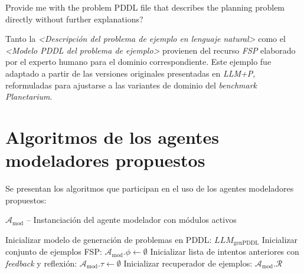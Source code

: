 \begin{anexes}
\begin{tcolorbox}[colback=gray!10!white, colframe=black, title=\textit{Prompt} del agente modelador con \textit{FSP}, fonttitle=\bfseries, breakable]
Provide me with the problem PDDL file that describes the planning problem directly without further explanations?
\end{tcolorbox}

Tanto la \textit{<Descripción del problema de ejemplo en lenguaje natural>} como el \textit{<Modelo PDDL del problema de ejemplo>} provienen del recurso \textit{FSP} elaborado por el experto humano para el dominio correspondiente. Este ejemplo fue adaptado a partir de las versiones originales presentadas en \textit{LLM+P}, reformuladas para ajustarse a las variantes de dominio del \textit{benchmark Planetarium}.


\section*{Algoritmos de los agentes modeladores propuestos}

Se presentan los algoritmos que participan en el uso de los agentes modeladores propuestos:

\begin{algorithm}[H]
\caption{\(\mathcal{A}_{\text{mod}}\) -- Instanciación del agente modelador con módulos activos}
\label{alg:instanciacion-agente}


Inicializar modelo de generación de problemas en PDDL: \(LLM_{\mathrm{genPDDL}}\)\;
Inicializar conjunto de ejemplos FSP: \(\mathcal{A}_{\mathrm{mod}}.\phi \leftarrow \emptyset\)\;
Inicializar lista de intentos anteriores con \textit{feedback} y reflexión: \(\mathcal{A}_{\mathrm{mod}}.\tau \leftarrow \emptyset\)\;
Inicializar recuperador de ejemplos: \(\mathcal{A}_{\mathrm{mod}}.\mathcal{R}\)\;


\end{algorithm}
\end{anexes}
